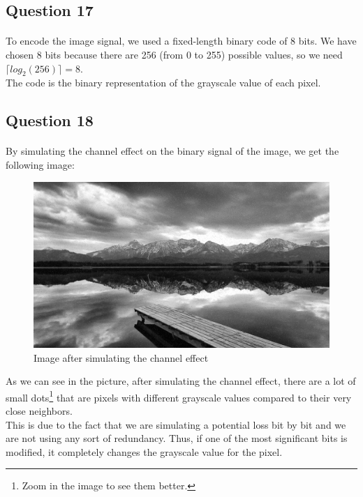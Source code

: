 \documentclass[a4paper, 11pt, oneside]{article}
\begin{document}

\subsection{Question 17}
\paragraph{}To encode the image signal, we used a fixed-length binary code of 8 bits. We have chosen 8 bits because there are 256 (from 0 to 255) possible values, so we need $\lceil log_2(256) \rceil =8$.\\
The code is the binary representation of the grayscale value of each pixel.


\subsection{Question 18}
\paragraph{}By simulating the channel effect on the binary signal of the image, we get the following image:
\begin{figure}[H]
    \centering
    \includegraphics[scale=0.2]{q18.png}
    \caption{Image after simulating the channel effect}
\end{figure}
As we can see in the picture, after simulating the channel effect, there are a lot of small dots\footnote{Zoom in the image to see them better.} that are pixels with different grayscale values
compared to their very close neighbors.\\
This is due to the fact that we are simulating a potential loss bit by bit and we are not using any sort of redundancy.
Thus, if one of the most significant bits is modified, it completely changes the grayscale value for the pixel.
\end{document}
